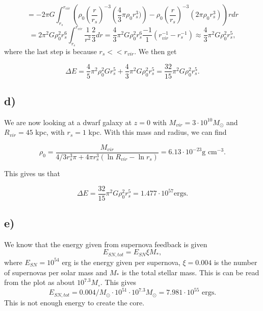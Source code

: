 \documentclass[a4paper,norsk, 10pt]{article}
\begin{document}
\begin{equation}
= -2\pi G \int_{r_s}^{r_{vir}} \left(\rho_0\left(\dfrac{r}{r_s}\right)^{-3}\left( \dfrac{4}{3}\pi \rho_0 r_s^3)\right) -  \rho_0\left(\dfrac{r}{r_s}\right)^{-3}\left(2\pi \rho_0 r_s^3 \right) \right)r dr
\end{equation}
\begin{equation}
= 2\pi^2 G \rho_0^2 r_s^6 \int_{r_s}^{r_{vir}} \frac{1}{r^2} \frac{2}{3} dr = \frac{4}{3}\pi^2 G \rho_0^2 r_s^6 \frac{-1}{1}\left(r_{vir}^{-1} - r_s^{-1}\right) \approx \frac{4}{3}\pi^2 G \rho_0^2 r_s^5,
\end{equation}
where the last step is because $r_s << r_{vir}$. We then get

\begin{equation}
\Delta E = \frac{4}{5}\pi^2 \rho_0^2 G r_s^5 + \frac{4}{3}\pi^2 G \rho_0^2 r_s^5 = \frac{32}{15}\pi^2 G \rho_0^2 r_s^5.
\end{equation}

\subsection{d)}
We are now looking at a dwarf galaxy at $z=0$ with $M_{vir} = 3\cdot10^{10}M_{\odot}$ and $R_{vir} = 45$ kpc, with $r_s = 1$ kpc. With this mass and radius, we can find

\begin{equation}
\rho_0 = \dfrac{M_{vir}}{4/3 r_{s}^3 \pi + 4\pi r_s^3(\ln R_{vir} - \ln r_s)} = 6.13\cdot10^{-23} \text{g cm}^{-3}.
\end{equation}

This gives us that

\begin{equation}
\Delta E = \frac{32}{15}\pi^2 G \rho_0^2 r_s^5 = 1.477\cdot 10^{57} \text{ergs}.
\end{equation}


\subsection{e)}
We know that the energy given from supernova feedback is given
\begin{equation}
E_{SN, tot} = E_{SN}\xi M_{*},
\end{equation}
where $E_{SN} = 10^{54}$ erg is the energy given per supernova, $\xi = 0.004$ is the number of supernovas per solar mass and $M_{*}$ is the total stellar mass. This is can be read from the plot as about $10^{7.3} M_{\circ}$. This gives 
\begin{equation}
E_{SN, tot} = 0.004 /M_{\odot} \cdot 10^{51}\cdot 10^{7.3} M_{\odot} = 7.981 \cdot 10^{55} \text{ ergs}.
\end{equation}
This is not enough energy to create the core.
\end{document}
